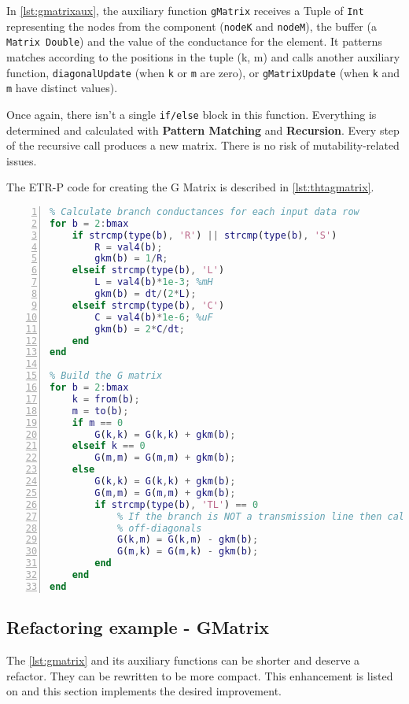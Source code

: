 In \cref{lst:gmatrixaux}, the auxiliary function \lstinline!gMatrix! receives a Tuple of \lstinline!Int! representing the nodes from the component (\lstinline!nodeK! and \lstinline!nodeM!), the buffer (a \lstinline!Matrix Double!) and the value of the conductance for the element. It patterns matches according to the positions in the tuple (k, m) and calls another auxiliary function, \lstinline!diagonalUpdate! (when \lstinline!k! or \lstinline!m! are zero), or \lstinline!gMatrixUpdate! (when \lstinline!k! and \lstinline!m! have distinct values).

Once again, there isn't a single \lstinline!if/else! block in this function. Everything is determined and calculated with \textbf{Pattern Matching} and \textbf{Recursion}. Every step of the recursive call produces a new matrix. There is no risk of mutability-related issues.

The ETR-P code for creating the G Matrix is described in \cref{lst:thtagmatrix}.

\begin{lstlisting}[language=Matlab, numbers=left, caption={G Matrix with ETR-P}, captionpos=b, label={lst:thtagmatrix}]
%% Build and partition the G matrix
% Calculate branch conductances for each input data row
for b = 2:bmax
    if strcmp(type(b), 'R') || strcmp(type(b), 'S')
        R = val4(b);
        gkm(b) = 1/R;
    elseif strcmp(type(b), 'L')
        L = val4(b)*1e-3; %mH
        gkm(b) = dt/(2*L);
    elseif strcmp(type(b), 'C')
        C = val4(b)*1e-6; %uF
        gkm(b) = 2*C/dt;
    end
end

% Build the G matrix
for b = 2:bmax
    k = from(b);
    m = to(b);
    if m == 0
        G(k,k) = G(k,k) + gkm(b);
    elseif k == 0
        G(m,m) = G(m,m) + gkm(b);
    else
        G(k,k) = G(k,k) + gkm(b);
        G(m,m) = G(m,m) + gkm(b);
        if strcmp(type(b), 'TL') == 0
            % If the branch is NOT a transmission line then calculate
            % off-diagonals
            G(k,m) = G(k,m) - gkm(b);
            G(m,k) = G(m,k) - gkm(b);
        end
    end
end
\end{lstlisting}

\subsection{ Refactoring example - GMatrix}

The \cref{lst:gmatrix} and its auxiliary functions can be shorter and deserve a refactor. They can be rewritten to be more compact. This enhancement is listed on \cite{thtahs} and this section implements the desired improvement.

